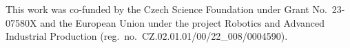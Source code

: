 \documentclass[sigplan,nonacm,10pt]{acmart}
\begin{document}
\maketitle











\begin{acks}
This work was co-funded by the Czech Science Foundation under Grant
No.~23-07580X and the European Union under the project Robotics and
Advanced Industrial Production
(reg.~no.~CZ.02.01.01/00/22\_008/0004590).
\end{acks}



\end{document}

